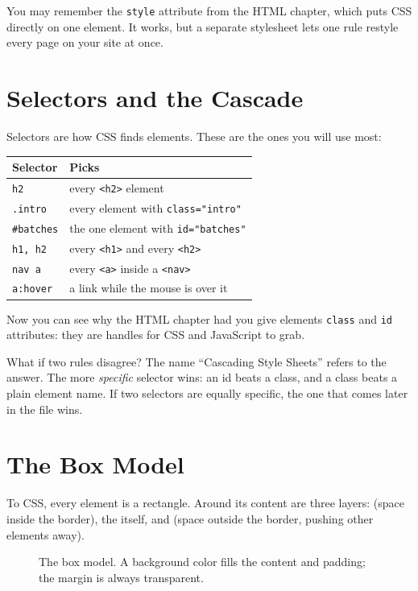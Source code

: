 You may remember the \verb|style| attribute from the HTML chapter, which puts CSS directly on one element.
It works, but a separate stylesheet lets one rule restyle every page on your site at once.

\section{Selectors and the Cascade}
Selectors are how CSS finds elements. These are the ones you will use most:

\begin{center}
\begin{tabular}{l l}
Selector & Picks \\
\hline
\verb|h2| & every \verb|<h2>| element \\
\verb|.intro| & every element with \verb|class="intro"| \\
\verb|#batches| & the one element with \verb|id="batches"| \\
\verb|h1, h2| & every \verb|<h1>| and every \verb|<h2>| \\
\verb|nav a| & every \verb|<a>| inside a \verb|<nav>| \\
\verb|a:hover| & a link while the mouse is over it \\
\end{tabular}
\end{center}

Now you can see why the HTML chapter had you give elements \verb|class| and \verb|id| attributes: they
are handles for CSS and JavaScript to grab.

What if two rules disagree? The name ``Cascading Style Sheets'' refers to the answer. The more
\emph{specific} selector wins: an id beats a class, and a class beats a plain element name. If two
selectors are equally specific, the one that comes later in the file wins.

\section{The Box Model}
To CSS, every element is a rectangle. Around its content are three layers:  (space
inside the border), the  itself, and  (space outside the border, pushing
other elements away).

\begin{figure}[htbp]
\centering
{}
\caption{The box model. A background color fills the content and padding; the margin is always
transparent.}
\label{fig:box-model}
\end{figure}

